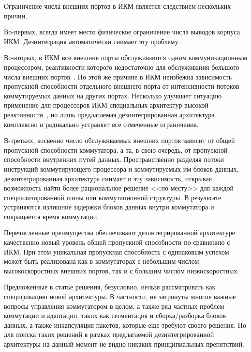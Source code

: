 \begin{multicols}{2}
  Ограничение числа внешних портов в ИКМ является следствием нескольких причин. 
  
  Во-пер\-вых, всегда имеет место физическое ограничение числа выводов корпуса ИКМ.
Дезинтеграция автоматически снимает эту проблему. 

Во-вторых, в ИКМ все внешние порты
обслуживаются одним коммуникационным процессором, реактивности которого недостаточно
для обслуживания большого числа внешних портов~\cite{7sok}. По этой же причине в ИКМ
неизбежна зависимость пропуск\-ной способности отдельного внешнего порта от ин\-тен\-сив\-ности
потоков ком\-му\-ти\-ру\-емых данных на других портах. 
Несколько улучшает %
 ситу\-а\-цию применение
для процессоров ИКМ специальных архитектур высокой реактивности~\cite{8sok, 9sok}, но
лишь предлагаемая дезинтегрированная архитектура комплексно и радикально устраняет все
отмеченные ограничения. 

В-третьих, косвенно число обслуживаемых внешних портов зависит
от общей пропускной способности коммутатора, а та, в свою очередь, от пропускной
способности внутренних путей данных. 
Пространственно разделяя потоки инструкций
ком\-му\-ти\-ру\-юще\-го процессора и коммутиру\-емых им блоков данных, дезинтегрированная
архитектура снимает и эту зависимость, открывая возможность найти более рациональное
решение <<по месту>> для каждой специализированной шины или коммутационной структуры.
В результате устраняются излишние задержки блоков данных внутри коммутатора и
сокращается время коммутации.

    Перечисленные преимущества обеспечивают дезинтегрированной архитектуре качественно
новый уровень общей пропускной способности по сравнению с ИКМ. При этом уникальная
пропускная способность с одинаковым успехом может быть реализована как в коммутаторах с
небольшим чис\-лом высокоскоростных внешних портов, так и с большим чис\-лом
низкоскоростных.

    Предложенные в статье решения, безусловно, нельзя рассматривать как спецификацию
новой архитектуры. В частности, не затронуты многие важные вопросы управления
коммутатором в целом, а также ряд частных проблем коммутации и адап\-та\-ции, таких как
сегментация и сборка/разборка блоков данных, а также инкапсуляция пакетов, которые еще
требуют своего решения. Но для поиска таких решений в рамках предлагаемой
дезинтегрированной архитектуры на данный момент не видно никаких принципиальных
препятствий.


{\small\frenchspacing
{%
\begin{thebibliography}{9}



\end{thebibliography}}}
\end{multicols}
